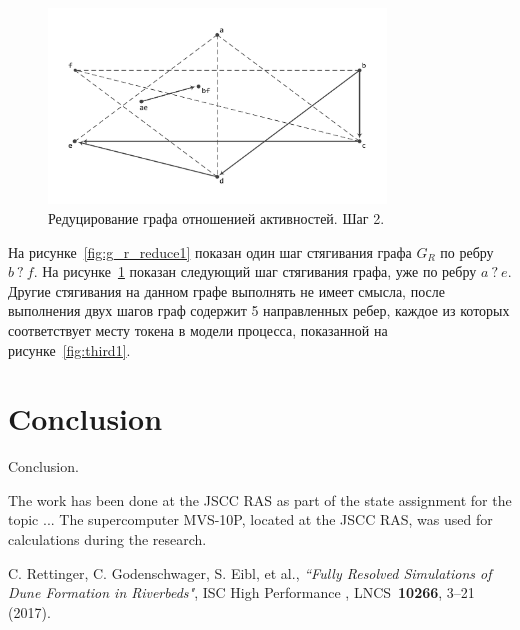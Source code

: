 \documentclass[
11pt,%
tightenlines,%
twoside,%
onecolumn,%
nofloats,%
nobibnotes,%
nofootinbib,%
superscriptaddress,%
noshowpacs,%
centertags]%
{revtex4}
\begin{document}
\begin{figure}[h]
\setcaptionmargin{5mm}
\includegraphics[width=0.8\textwidth]{pics/g_r_reduce2.pdf}
\caption{Редуцирование графа отношенией активностей. Шаг 2.}
\label{fig:g_r_reduce2}
\end{figure}

На рисунке~\ref{fig:g_r_reduce1} показан один шаг стягивания графа $G_R$ по ребру $b \ ? \ f$.
На рисунке~\ref{fig:g_r_reduce2} показан следующий шаг стягивания графа, уже по ребру $a \ ? \ e$.
Другие стягивания на данном графе выполнять не имеет смысла, после выполнения двух шагов граф содержит 5 направленных ребер, каждое из которых соответствует месту токена в модели процесса, показанной на рисунке~\ref{fig:third1}.

\section{Conclusion}

Conclusion.

\begin{acknowledgments}
The work has been done at the JSCC RAS as part of the state assignment for the topic ... The supercomputer MVS-10P, located at the JSCC RAS, was used for calculations during the research.
\end{acknowledgments}

\begin{thebibliography}{99}

C. Rettinger, C. Godenschwager, S. Eibl, et al., {\it ``Fully Resolved Simulations of Dune Formation in Riverbeds"}, ISC High Performance , LNCS~{\bf 10266}, 3--21 (2017).

\end{thebibliography}
\end{document}
